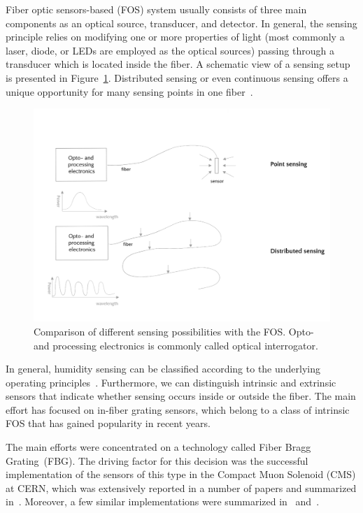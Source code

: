 Fiber optic sensors-based (\gls{FOS}) system usually consists of three main components as an optical source, transducer, and detector. In general, the sensing principle relies on modifying one or more properties of light (most commonly a laser, diode, or LEDs are employed as the optical sources) passing through a transducer which is located inside the fiber. A schematic view of a sensing setup is presented in Figure~\ref{fig:sensing}. Distributed sensing or even continuous sensing offers a unique opportunity for many sensing points in one fiber~\cite{GRATTAN200040}. 
\newpage
\begin{figure}[!h]
\centering
\includegraphics[width=0.95\columnwidth]{Chapter5/images/sensing.png}
\caption{Comparison of different sensing possibilities with the \gls{FOS}. Opto- and processing electronics is commonly called optical interrogator.}
\label{fig:sensing}
\end{figure}

In general, humidity sensing can be classified according to the underlying operating principles~\cite{fos_overview}. Furthermore, we can distinguish intrinsic and extrinsic sensors that indicate whether sensing occurs inside or outside the fiber. The main effort has focused on in-fiber grating sensors, which belong to a class of intrinsic \gls{FOS} that has gained popularity in recent years. 

The main efforts were concentrated on a technology called Fiber Bragg Grating~(\gls{FBG}). The driving factor for this decision was the successful implementation of the sensors of this type in the Compact Muon Solenoid (\gls{CMS}) at \gls{CERN}, which was extensively reported in a number of papers and summarized in~\cite{Berruti}. Moreover, a few similar implementations were summarized in~\cite{YEO_PI} and~\cite{Kronenberg:02}. 

